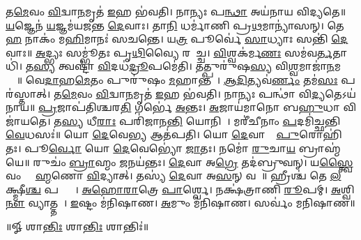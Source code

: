 𑌤\ul{𑌮𑍇}𑌵𑌂 \ul{𑌵𑌿}𑌦𑍍𑌵𑌾\ul{𑌨}𑌮𑍃𑌤॑ \ul{𑌇}𑌹 𑌭॑𑌵𑌤𑌿। 
𑌨𑌾𑌨𑍍𑌯𑌃 𑌪\ul{𑌨𑍍𑌥𑌾} 𑌅𑌯॑𑌨𑌾𑌯 𑌵𑌿𑌦𑍍𑌯𑌤𑍇॥ 
% 
\ul{𑌯}𑌜𑍍𑌞𑍇𑌨॑ \ul{𑌯}𑌜𑍍𑌞𑌮॑𑌯𑌜𑌨𑍍𑌤 \ul{𑌦𑍇}𑌵𑌾𑌃। 
𑌤𑌾\ul{𑌨𑌿} 𑌧𑌰𑍍𑌮𑌾॑𑌣𑌿 𑌪𑍍𑌰\ul{𑌥}𑌮𑌾𑌨𑍍𑌯𑌾॑𑌸𑌨𑍍। 
𑌤𑍇 \ul{𑌹} 𑌨𑌾𑌕𑌂॑ 𑌮\ul{𑌹𑌿}𑌮𑌾𑌨𑌃॑ 𑌸𑌚𑌨𑍍𑌤𑍇। 
𑌯\ul{𑌤𑍍𑌰} 𑌪𑍂𑌰𑍍𑌵𑍇॑ \ul{𑌸𑌾}𑌧𑍍𑌯𑌾𑌃 𑌸𑌨𑍍𑌤𑌿॑ \ul{𑌦𑍇}𑌵𑌾𑌃॥ 
% 
\ul{𑌅}𑌦𑍍𑌭𑍍𑌯𑌃 𑌸𑌮𑍍𑌭𑍂॑𑌤𑌃 𑌪𑍃\ul{𑌥𑌿}𑌵𑍍𑌯𑍈 𑌰𑌸𑌾᳚𑌚𑍍𑌚। 
\ul{𑌵𑌿}𑌶𑍍𑌵𑌕॑𑌰𑍍𑌮\ul{𑌣𑌃} 𑌸𑌮॑𑌵\ul{𑌰𑍍𑌤}𑌤𑌾𑌧𑌿॑। 
𑌤\ul{𑌸𑍍𑌯} 𑌤𑍍𑌵𑌷𑍍𑌟𑌾॑ \ul{𑌵𑌿}𑌦𑌧॑\ul{𑌦𑍍𑌰𑍂}𑌪𑌮𑍇॑𑌤𑌿। 
𑌤𑌤𑍍𑌪𑍁𑌰𑍁॑𑌷\ul{𑌸𑍍𑌯} 𑌵𑌿\ul{𑌶𑍍𑌵}𑌮𑌾𑌜𑌾॑\ul{𑌨}𑌮𑌗𑍍𑌰𑍇᳚॥ 
% 
𑌵𑍇\ul{𑌦𑌾}𑌹\ul{𑌮𑍇}𑌤𑌂 𑌪𑍁𑌰𑍁॑𑌷𑌂 \ul{𑌮}𑌹𑌾𑌨𑍍𑌤𑌮𑍍᳚। 
\ul{𑌆}\ul{𑌦𑌿}𑌤𑍍𑌯𑌵॑\ul{𑌰𑍍𑌣𑌂} 𑌤𑌮॑\ul{𑌸𑌃} 𑌪𑌰॑𑌸𑍍𑌤𑌾𑌤𑍍। 
𑌤\ul{𑌮𑍇}𑌵𑌂 \ul{𑌵𑌿}𑌦𑍍𑌵𑌾\ul{𑌨}𑌮𑍃𑌤॑ \ul{𑌇}𑌹 𑌭॑𑌵𑌤𑌿। 
𑌨𑌾𑌨𑍍𑌯𑌃 𑌪𑌨𑍍𑌥𑌾॑ 𑌵𑌿\ul{𑌦𑍍𑌯}𑌤𑍇𑌽𑌯॑𑌨𑌾𑌯॥ 
% 
\ul{𑌪𑍍𑌰}𑌜𑌾𑌪॑𑌤𑌿𑌶𑍍𑌚𑌰\ul{𑌤𑌿} 𑌗𑌰𑍍𑌭𑍇॑ \ul{𑌅}𑌨𑍍𑌤𑌃। 
\ul{𑌅}𑌜𑌾𑌯॑𑌮𑌾𑌨𑍋 𑌬\ul{𑌹𑍁}𑌧𑌾 𑌵𑌿𑌜𑌾॑𑌯𑌤𑍇। 
𑌤\ul{𑌸𑍍𑌯} 𑌧𑍀\ul{𑌰𑌾𑌃} 𑌪𑌰𑌿॑𑌜𑌾𑌨\ul{𑌨𑍍𑌤𑌿} 𑌯𑍋𑌨𑌿𑌮𑍍᳚। 
𑌮𑌰𑍀॑𑌚𑍀𑌨𑌾𑌂 \ul{𑌪}𑌦𑌮𑌿॑𑌚𑍍𑌛𑌨𑍍𑌤𑌿 \ul{𑌵𑍇}𑌧𑌸𑌃॑॥ 
% 
𑌯𑍋 \ul{𑌦𑍇}𑌵𑍇\ul{𑌭𑍍𑌯} 𑌆𑌤॑𑌪𑌤𑌿। 
𑌯𑍋 \ul{𑌦𑍇}𑌵𑌾𑌨𑌾𑌂᳚ \ul{𑌪𑍁}𑌰𑍋𑌹𑌿॑𑌤𑌃। 
𑌪𑍂\ul{𑌰𑍍𑌵𑍋} 𑌯𑍋 \ul{𑌦𑍇}𑌵𑍇𑌭𑍍𑌯𑍋॑ \ul{𑌜𑌾}𑌤𑌃। 
𑌨𑌮𑍋॑ \ul{𑌰𑍁}𑌚𑌾\ul{𑌯} 𑌬𑍍𑌰𑌾𑌹𑍍𑌮॑𑌯𑍇॥ 
% 
𑌰𑍁𑌚𑌂॑ \ul{𑌬𑍍𑌰𑌾}𑌹𑍍𑌮𑌂 \ul{𑌜}𑌨𑌯॑𑌨𑍍𑌤𑌃। 
\ul{𑌦𑍇}𑌵𑌾 𑌅\ul{𑌗𑍍𑌰𑍇} 𑌤𑌦॑𑌬𑍍𑌰𑍁𑌵𑌨𑍍। 
𑌯\ul{𑌸𑍍𑌤𑍍𑌵𑍈}𑌵𑌂 𑌬𑍍𑌰𑌾᳚\ul{𑌹𑍍𑌮}𑌣𑍋 \ul{𑌵𑌿}𑌦𑍍𑌯𑌾𑌤𑍍। 
𑌤𑌸𑍍𑌯॑ \ul{𑌦𑍇}𑌵𑌾 𑌅\ul{𑌸}𑌨𑍍 𑌵𑌶𑍇᳚॥ 
% 
𑌹𑍍𑌰𑍀𑌶𑍍𑌚॑ 𑌤𑍇 \ul{𑌲}𑌕𑍍𑌷𑍍𑌮𑍀\ul{𑌶𑍍𑌚} 𑌪𑌤𑍍𑌨𑍍𑌯𑍗᳚। 
\ul{𑌅}\ul{𑌹𑍋}\ul{𑌰𑌾}𑌤𑍍𑌰𑍇 \ul{𑌪𑌾}𑌰𑍍𑌶𑍍𑌵𑍇। 
𑌨𑌕𑍍𑌷॑𑌤𑍍𑌰𑌾𑌣𑌿 \ul{𑌰𑍂}𑌪𑌮𑍍। 
\ul{𑌅}𑌶𑍍𑌵𑌿\ul{𑌨𑍗} 𑌵𑍍𑌯𑌾𑌤𑍍𑌤𑌮𑍍᳚। 
\ul{𑌇}𑌷𑍍𑌟𑌂 𑌮॑𑌨𑌿𑌷𑌾𑌣। 
\ul{𑌅}𑌮𑍁𑌂 𑌮॑𑌨𑌿𑌷𑌾𑌣। 
𑌸𑌰𑍍𑌵𑌂॑ 𑌮𑌨𑌿𑌷𑌾𑌣॥ 
% 


\centerline{॥𑍐 𑌶𑌾\ul{𑌨𑍍𑌤𑌿𑌃} 𑌶𑌾\ul{𑌨𑍍𑌤𑌿𑌃} 𑌶𑌾𑌨𑍍𑌤𑌿𑌃॑॥}
